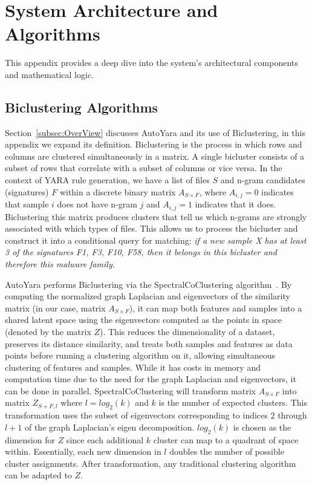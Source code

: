 
\section{System Architecture and Algorithms}
\vspace{-2mm}

\noindent This appendix provides a deep dive into the system’s architectural components and mathematical logic.



\subsection{Biclustering Algorithms}

\label{app:biclustering}


 \noindent Section~\ref{subsec:OverView} discusses AutoYara and its use of Biclustering, in this appendix we expand its definition. Biclustering is the process in which rows and columns are clustered simultaneously in a matrix. A single bicluster consists of a subset of rows that correlate with a subset of columns or vice versa. In the context of YARA rule generation, we have a list of files $S$ and n-gram candidates (signatures) $F$ within a discrete binary matrix $A_{S \times F}$, where $A_{i,j} = 0$ indicates that sample $i$ does not have n-gram $j$ and $A_{i,j} = 1$ indicates that it does. Biclustering this matrix produces clusters that tell us which n-grams are strongly associated with which types of files. This allows us to process the bicluster and construct it into a conditional query for matching: \textit{if a new sample X has at least 3 of the signatures F1, F3, F10, F58, then it belongs in this bicluster and therefore this malware family.}

 AutoYara performs Biclustering via the SpectralCoClustering algorithm~\cite{dhillon2001_spectralcoclustering}. By computing the normalized graph Laplacian and eigenvectors of the similarity matrix (in our case, matrix $A_{S \times F}$), it can map both features and samples into a shared latent space using the eigenvectors computed as the points in space (denoted by the matrix $Z$). This reduces the dimensionality of a dataset, preserves its distance similarity, and treats both samples and features as data points before running a clustering algorithm on it, allowing simultaneous clustering of features and samples. While it has costs in memory and computation time due to the need for the graph Laplacian and eigenvectors, it can be done in parallel. SpectralCoClustering will transform matrix $A_{S \times F}$ into matrix $Z_{S + F, l}$ where $l = log_2(k)$ and $k$ is the number of expected clusters. This transformation uses the subset of eigenvectors corresponding to indices $2$ through $l+1$ of the graph Laplacian's eigen decomposition. $log_2(k)$ is chosen as the dimension for $Z$ since each additional $k$ cluster can map to a quadrant of space within. Essentially, each new dimension in $l$ doubles the number of possible cluster assignments. After transformation, any traditional clustering algorithm can be adapted to $Z$.




